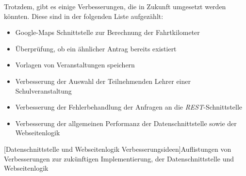 Trotzdem, gibt es einige Verbesserungen, die in Zukunft umgesetzt werden könnten. Diese sind in der folgenden Liste aufgezählt:
\begin{itemize}
	\item Google-Maps Schnittstelle zur Berechnung der Fahrtkilometer
	\item Überprüfung, ob ein ähnlicher Antrag bereits existiert
	\item Vorlagen von Veranstaltungen speichern
	\item Verbesserung der Auswahl der Teilnehmenden Lehrer einer Schulveranstaltung
	\item Verbesserung der Fehlerbehandlung der Anfragen an die \textit{REST}-Schnittstelle
	\item Verbesserung der allgemeinen Performanz der Datenschnittstelle sowie der Webseitenlogik
\end{itemize}
[Datenschnittstelle und Webseitenlogik Verbesserungsideen]{Auflistungen von Verbesserungen zur zukünftigen Implementierung, der Datenschnittstelle und Webseitenlogik}